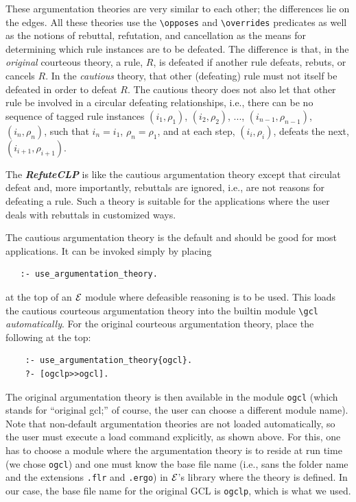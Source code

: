 \documentclass[11pt]{article}
\newcommand{\ERGO}{\mbox{\ensuremath{\cal{E}}\smaller{{\sc{RGO}}}}\xspace}
\newcommand{\FLSYSTEM}{\ERGO}
\newcommand{\bs}{\textbackslash}
\begin{document}
These argumentation theories are very similar to each other; the
differences lie on the edges. All these theories use the {\tt \bs{}opposes} and
{\tt \bs{}overrides} predicates as well as the notions of rebuttal,
refutation, and cancellation as the means for determining which rule
instances are to be defeated. The difference is that, in the \emph{original} courteous
theory, a rule, $R$, is defeated if another rule defeats, rebuts, or
cancels $R$.
In the \emph{cautious} theory, that other (defeating)
rule must not itself be defeated in order to
defeat $R$. The cautious theory does not also let that other rule be
involved in a circular defeating relationships,
i.e., there can be no sequence of
  tagged rule instances $(i_1,\rho_1)$, $(i_2,\rho_2)$, ...,
  $(i_{n-1},\rho_{n-1})$, $(i_n,\rho_n)$, such that $i_n=i_1$,
  $\rho_n=\rho_1$, and at each step, $(i_i,\rho_i)$, defeats the next,
  $(i_{i+1},\rho_{i+1})$.

The \textbf{\emph{RefuteCLP}}  is like the cautious argumentation
theory except that circulat defeat and, more importantly,
rebuttals are ignored, i.e., are not reasons for defeating a rule.
Such a theory is suitable for the applications where the user deals with
rebuttals in customized ways.

The cautious argumentation theory is the default and should be good for most
  applications. It can be invoked simply by placing
\begin{verbatim}
   :- use_argumentation_theory.
\end{verbatim}
  at the top of an \FLSYSTEM module where defeasible reasoning is to be
  used.  This loads the cautious courteous argumentation theory into the builtin
  module {\tt \bs{}gcl} \emph{automatically}. For the original courteous argumentation theory,
  place the following at the top:
\begin{verbatim}
    :- use_argumentation_theory{ogcl}.
    ?- [ogclp>>ogcl].
\end{verbatim}
The original argumentation theory is then available in the module {\tt ogcl}
(which stands for ``original gcl;'' of course, the user can choose a different module name).
Note that non-default argumentation theories are not loaded
automatically, so the user must execute a load command explicitly, as shown
above. For this, one has to choose a module where the
argumentation theory is to reside at run time
(we chose \texttt{ogcl}) and one must know the base file
name (i.e., sans the folder name and the extensions \texttt{.flr} and
\texttt{.ergo}) in \FLSYSTEM's library where the theory is defined. In our case, the base file name
for the original GCL is \texttt{ogclp}, which is what we used. 
\end{document}
